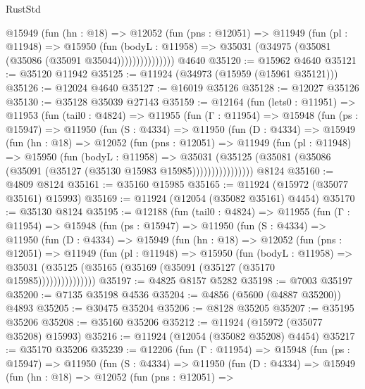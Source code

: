 \begin{lexlean}{RustStd}
\begin{coremodule}
                @15949
                  (fun (hn : @18) =>
                  @12052
                    (fun (pns : @12051) =>
                    @11949
                      (fun (pl : @11948) =>
                      @15950
                        (fun (bodyL : @11958) =>
                        @35031 (@34975 (@35081 (@35086 (@35091 @35044)))))))))))))))
    @4640
@35120 := @15962 @4640
@35121 := @35120 @11942
@35125 := @11924 (@34973 (@15959 (@15961 @35121)))
@35126 := @12024 @4640
@35127 := @16019 @35126
@35128 := @12027 @35126
@35130 := @35128 @35039 @27143
@35159 := @12164
    (fun (lets0 : @11951) =>
    @11953
      (fun (tail0 : @4824) =>
      @11955
        (fun (Γ : @11954) =>
        @15948
          (fun (ps : @15947) =>
          @11950
            (fun (S : @4334) =>
            @11950
              (fun (D : @4334) =>
              @15949
                (fun (hn : @18) =>
                @12052
                  (fun (pns : @12051) =>
                  @11949
                    (fun (pl : @11948) =>
                    @15950
                      (fun (bodyL : @11958) =>
                      @35031
                        (@35125
                          (@35081 (@35086 (@35091 (@35127 (@35130 @15983 @15985))))))))))))))))
    @8124
@35160 := @4809 @8124
@35161 := @35160 @15985
@35165 := @11924 (@15972 (@35077 @35161) @15993)
@35169 := @11924 (@12054 (@35082 @35161) @4454)
@35170 := @35130 @8124
@35195 := @12188
    (fun (tail0 : @4824) =>
    @11955
      (fun (Γ : @11954) =>
      @15948
        (fun (ps : @15947) =>
        @11950
          (fun (S : @4334) =>
          @11950
            (fun (D : @4334) =>
            @15949
              (fun (hn : @18) =>
              @12052
                (fun (pns : @12051) =>
                @11949
                  (fun (pl : @11948) =>
                  @15950
                    (fun (bodyL : @11958) =>
                    @35031 (@35125 (@35165 (@35169 (@35091 (@35127 (@35170 @15985)))))))))))))))
@35197 := @4825 @8157 @5282
@35198 := @7003 @35197
@35200 := @7135 @35198 @4536
@35204 := @4856 (@5600 (@4887 @35200)) @4893
@35205 := @30475 @35204
@35206 := @8128 @35205
@35207 := @35195 @35206
@35208 := @35160 @35206
@35212 := @11924 (@15972 (@35077 @35208) @15993)
@35216 := @11924 (@12054 (@35082 @35208) @4454)
@35217 := @35170 @35206
@35239 := @12206
    (fun (Γ : @11954) =>
    @15948
      (fun (ps : @15947) =>
      @11950
        (fun (S : @4334) =>
        @11950
          (fun (D : @4334) =>
          @15949
            (fun (hn : @18) =>
            @12052
              (fun (pns : @12051) =>

\end{coremodule}
\end{lexlean}
